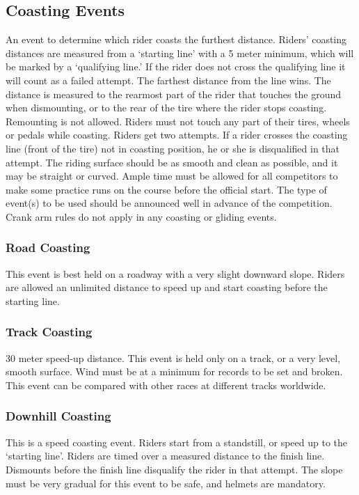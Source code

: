 \subsection{Coasting Events}
An event to determine which rider coasts the furthest distance.
Riders' coasting distances are measured from a `starting line' with a 5 meter minimum, which will be marked by a `qualifying line.'
If the rider does not cross the qualifying line it will count as a failed attempt.
The farthest distance from the line wins.
The distance is measured to the rearmost part of the rider that touches the ground when dismounting, or to the rear of the tire where the rider stops coasting.
Remounting is not allowed.
Riders must not touch any part of their tires, wheels or pedals while coasting.
Riders get two attempts.
If a rider crosses the coasting line (front of the tire) not in coasting position, he or she is disqualified in that attempt.
The riding surface should be as smooth and clean as possible, and it may be straight or curved.
Ample time must be allowed for all competitors to make some practice runs on the course before the official start.
The type of event(s) to be used should be announced well in advance of the competition.
Crank arm rules do not apply in any coasting or gliding events.

\subsubsection{Road Coasting}

This event is best held on a roadway with a very slight downward slope.
Riders are allowed an unlimited distance to speed up and start coasting before the starting line.

\subsubsection{Track Coasting \label{subsubsec:track-field_alternate-optional-fun-events_coasting_track-coasting}}
30 meter speed-up distance.
This event is held only on a track, or a very level, smooth surface.
Wind must be at a minimum for records to be set and broken.
This event can be compared with other races at different tracks worldwide.

\subsubsection{Downhill Coasting}
This is a speed coasting event.
Riders start from a standstill, or speed up to the `starting line'.
Riders are timed over a measured distance to the finish line.
Dismounts before the finish line disqualify the rider in that attempt.
The slope must be very gradual for this event to be safe, and helmets are mandatory.

